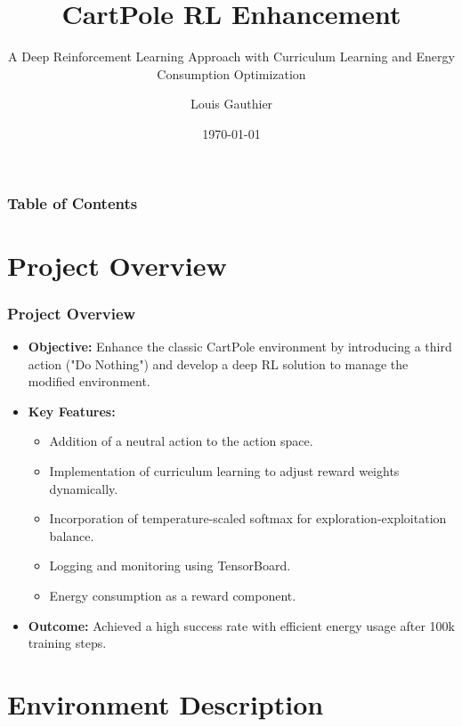 \documentclass{beamer}
\title{CartPole RL Enhancement}
\subtitle{A Deep Reinforcement Learning Approach with Curriculum Learning and Energy Consumption Optimization}
\author{Louis Gauthier}
\date{\today}
\begin{document}
\frame{\titlepage}

\begin{frame}
\frametitle{Table of Contents}
\tableofcontents
\end{frame}

\section{Project Overview}

\begin{frame}
\frametitle{Project Overview}
\begin{itemize}
    \item \textbf{Objective:} Enhance the classic CartPole environment by introducing a third action ("Do Nothing") and develop a deep RL solution to manage the modified environment.
    \item \textbf{Key Features:}
    \begin{itemize}
        \item Addition of a neutral action to the action space.
        \item Implementation of curriculum learning to adjust reward weights dynamically.
        \item Incorporation of temperature-scaled softmax for exploration-exploitation balance.
        \item Logging and monitoring using TensorBoard.
        \item Energy consumption as a reward component.
    \end{itemize}
    \item \textbf{Outcome:} Achieved a high success rate with efficient energy usage after 100k training steps.
\end{itemize}
\end{frame}

\section{Environment Description}
\end{document}

